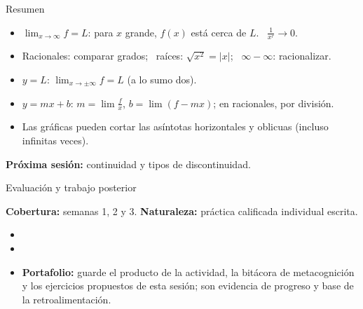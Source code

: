 \documentclass[10pt,aspectratio=169]{beamer}
\begin{document}
\begin{frame}{Resumen}
  \begin{itemize}
    \item $\lim_{x\to\infty}f=L$: para $x$ grande, $f(x)$ está cerca de $L$. \ $\frac1{x^r}\to0$.
    \item Racionales: comparar grados; \ raíces: $\sqrt{x^2}=|x|$; \ $\infty-\infty$: racionalizar.
    \item {} $y=L$: $\lim_{x\to\pm\infty}f=L$ (a lo sumo dos).
    \item {} $y=mx+b$: $m=\lim\frac{f}{x}$, $b=\lim(f-mx)$; en racionales, por división.
    \item Las gráficas pueden cortar las asíntotas horizontales y oblicuas (incluso infinitas veces).
  \end{itemize}
  \vspace{3mm}
  \textbf{Próxima sesión:} continuidad y tipos de discontinuidad.
\end{frame}


\begin{frame}{Evaluación y trabajo posterior}
  \small
  \begin{evalbox}
    \textbf{Cobertura:} semanas 1, 2 y 3. \textbf{Naturaleza:} práctica calificada individual escrita.
  \end{evalbox}
  \begin{itemize}
    \item \criterios
    \item \declaracionia
    \item \textbf{Portafolio:} guarde el producto de la actividad, la bitácora de metacognición y los ejercicios propuestos de esta sesión; son evidencia de progreso y base de la retroalimentación.
  \end{itemize}
\end{frame}
\end{document}
